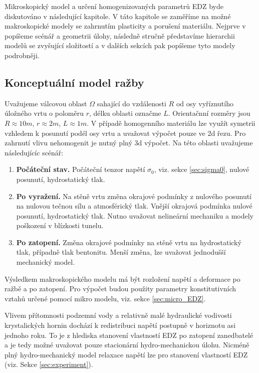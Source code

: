 \documentclass{article}
\begin{document}
Mikroskopický model a určení homogenizovaných parametrů EDZ byde diskutováno v následující kapitole.
V táto kapitole se zaměříme na možné makroskopické modely se zahrnutím plasticity a porušení materiálu.
Nejprve v popíšeme scénář a geometrii úlohy, následně stručně představíme hierarchii modelů se zvyšující složitostí
a v dalších sekcích pak popíšeme tyto modely podrobněji.

\subsection{Konceptuální model ražby}
Uvažujeme válcovou oblast $\Omega$ sahající do vzdálenosti $R$ od osy vyříznutího úložného vrtu o poloměru $r$, délku oblasti označme $L$. Orientačnní rozměry jsou $R\approx 10m$, $r\approx 2m$, $L\approx 1m$. V případě homogenního materiálu lze využít symetrii vzhledem k posunutí podél osy vrtu a uvažovat výpočet pouze ve 2d řezu. Pro zahrnutí vlivu nehomogenit je nutný plný 3d výpočet. Na této oblasti uvažujeme následujícíc scénář:

\begin{enumerate}
\item {\bf Počáteční stav.} Počáteční tenzor napětí $\sigma_0$, viz. sekce \ref{sec:sigma0}, nulové posunutí, hydrostatický tlak.
                       
\item {\bf Po vyražení.} Na stěně vrtu změna okrajové podmínky z nulového posunutí na nulovou tečnou sílu a 
                         atmosférický tlak. Vnější okrajová podmínka nulové posunutí, hydrostatický tlak.
                         Nutno uvažovat nelineární mechaniku a modely poškození v blízkosti tunelu.                    
                         
\item {\bf Po zatopení.} Změna okrajové podmínky na stěně vrtu na hydrostatický tlak, případně tlak bentonitu. 
                        Menší změna, lze uvažovat jednodušší mechanický model.
\end{enumerate}
Výsledkem makroskopického modelu má být rozložení napětí a deformace po ražbě a po zatopení. Pro výpočet budou použity 
parametry konstitutivních vztahů určené pomocí mikro modelu, viz. sekce \ref{sec:micro_EDZ}. 


Vlivem přítomnosti podzemní vody a relativně malé hydraulické vodivosti krystalických hornin dochází k redistribuci napětí 
postupně v horiznotu asi jednoho roku. To je z hlediska stanovení vlastností EDZ po zatopení zanedbatelé a je tedy možné uvažovat 
pouze stacionární hydro-mechanickou úlohu. Nicméně plný hydro-mechanický model relaxace napětí lze pro stanovení vlastností EDZ (viz. Sekce \ref{sec:experiment}).
\end{document}
